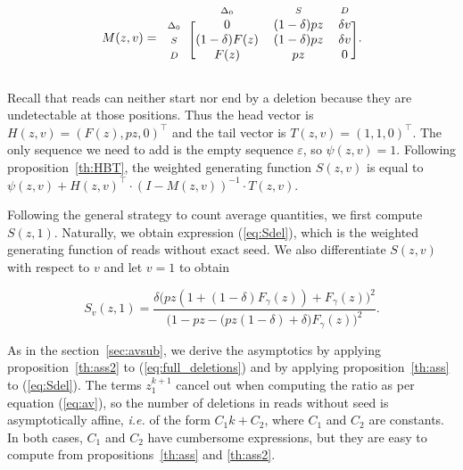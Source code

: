 \documentclass{article}
\newcommand{\smD}{\scriptstyle{D}}
\newcommand{\smS}{\scriptstyle{S}}
\newcommand{\smDELz}{\scriptstyle{\Delta_0}}
\begin{document}
\begin{equation*}
M(z,v) = 
\begin{blockarray}{cccc}
       & \smDELz & \smS & \smD \\
\begin{block}{c[ccc]}
\smDELz & 0              & (1-\delta)pz & \delta v \\
\smS    & (1-\delta)F(z) & (1-\delta)pz & \delta v \\
\smD    & F(z)           & pz           & 0        \\
\end{block}
\end{blockarray}.
\end{equation*}

Recall that reads can neither start nor end by a deletion because they are
undetectable at those positions. Thus the head vector is $H(z,v) = (F(z),
pz, 0)^\top$ and the tail vector is $T(z,v) = (1,1,0)^\top$. The only
sequence we need to add is the empty sequence $\varepsilon$, so $\psi(z,v)
= 1$. Following proposition~\ref{th:HBT}, the weighted generating function
$S(z,v)$ is equal to $\psi(z,v) + H(z,v)^\top \cdot (I-M(z,v))^{-1} \cdot
T(z,v)$.

Following the general strategy to count average quantities, we first
compute $S(z,1)$. Naturally, we obtain expression (\ref{eq:Sdel}), which
is the weighted generating function of reads without exact seed. We also
differentiate $S(z,v)$ with respect to $v$ and let $v=1$ to obtain

\begin{equation}
\label{eq:full_deletions}
S_v(z,1) =
\frac{\delta\big( pz(1+(1-\delta)F_\gamma(z))+F_\gamma(z) \big)^2}
{\big( 1-pz - \big(pz(1-\delta) + \delta\big)F_\gamma(z) \big)^2}.
\end{equation}

As in the section~\ref{sec:avsub}, we derive the asymptotics by applying
proposition~\ref{th:ass2} to (\ref{eq:full_deletions}) and by applying
proposition~\ref{th:ass} to (\ref{eq:Sdel}). The terms $z_1^{k+1}$ cancel
out when computing the ratio as per equation (\ref{eq:av}), so the number
of deletions in reads without seed is asymptotically affine, \textit{i.e.}
of the form $C_1k+C_2$, where $C_1$ and $C_2$ are constants. In both
cases, $C_1$ and $C_2$ have cumbersome expressions, but they are easy to
compute from propositions~\ref{th:ass} and \ref{th:ass2}.
\end{document}
